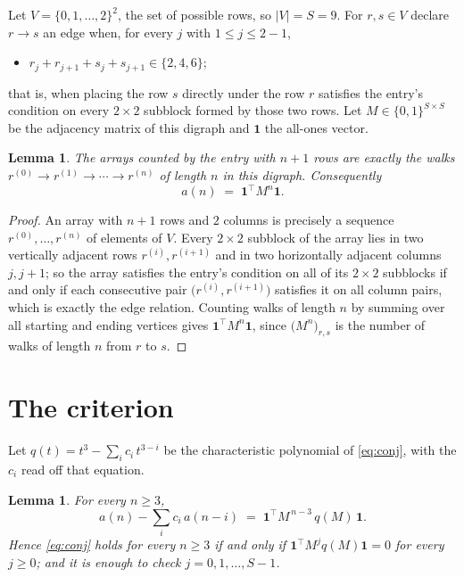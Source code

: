 \documentclass[11pt,a4paper]{article}
\theoremstyle{plain}
\newtheorem{lemma}[theorem]{Lemma}
\theoremstyle{definition}
\begin{document}
Let $V=\{0,1,\dots,2\}^{2}$, the set of possible rows, so $|V|=S=9$. For
$r,s\in V$ declare $r\to s$ an edge when, for every $j$ with $1\le j\le 2-1$,
\begin{itemize}
\item $r_j+r_{j+1}+s_j+s_{j+1}\in\{2, 4, 6\}$;

\end{itemize}
that is, when placing the row $s$ directly under the row $r$ satisfies the entry's
condition on every $2\times2$ subblock formed by those two rows. Let $M\in\{0,1\}^{S\times
S}$ be the adjacency matrix of this digraph and $\mathbf{1}$ the all-ones vector.

\begin{lemma}\label{lem:walk}
The arrays counted by the entry with $n+1$ rows are exactly the walks
$r^{(0)}\to r^{(1)}\to\cdots\to r^{(n)}$ of length $n$ in this digraph. Consequently
\[
a(n)\;=\;\mathbf{1}^{\!\top}M^{n}\mathbf{1} .
\]
\end{lemma}

\begin{proof}
An array with $n+1$ rows and $2$ columns is precisely a sequence
$r^{(0)},\dots,r^{(n)}$ of elements of $V$. Every $2\times2$ subblock of the array lies
in two vertically adjacent rows $r^{(i)},r^{(i+1)}$ and in two horizontally adjacent
columns $j,j+1$; so the array satisfies the entry's condition on all of its $2\times2$
subblocks if and only if each consecutive pair $\bigl(r^{(i)},r^{(i+1)}\bigr)$ satisfies
it on all column pairs, which is exactly the edge relation. Counting walks of length $n$ by
summing over all starting and ending vertices gives
$\mathbf{1}^{\!\top}M^{n}\mathbf{1}$, since
$\bigl(M^{n}\bigr)_{r,s}$ is the number of walks of length $n$ from $r$ to $s$.
\end{proof}

\section{The criterion}

Let $q(t)=t^{3}-\sum_{i}c_i\,t^{3-i}$ be the characteristic polynomial of
\eqref{eq:conj}, with the $c_i$ read off that equation.

\begin{lemma}\label{lem:crit}
For every $n\ge3$,
\[
a(n)-\sum_i c_i\,a(n-i)\;=\;\mathbf{1}^{\!\top}M^{\,n-3}\,q(M)\,\mathbf{1} .
\]
Hence \eqref{eq:conj} holds for every $n\ge3$ if and only if
$\mathbf{1}^{\!\top}M^{j}q(M)\mathbf{1}=0$ for every $j\ge0$; and it is enough to
check $j=0,1,\dots,S-1$.
\end{lemma}
\end{document}
